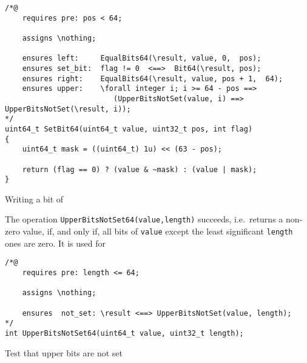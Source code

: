 \begin{listing}[hbt]
\begin{minipage}{0.99\textwidth}
\begin{lstlisting}[style=acsl-block]
/*@
    requires pre: pos < 64;

    assigns \nothing;

    ensures left:     EqualBits64(\result, value, 0,  pos);
    ensures set_bit:  flag != 0  <==>  Bit64(\result, pos);
    ensures right:    EqualBits64(\result, value, pos + 1,  64);
    ensures upper:    \forall integer i; i >= 64 - pos ==>
                         (UpperBitsNotSet(value, i) ==> UpperBitsNotSet(\result, i));
*/
uint64_t SetBit64(uint64_t value, uint32_t pos, int flag)
{
    uint64_t mask = ((uint64_t) 1u) << (63 - pos);

    return (flag == 0) ? (value & ~mask) : (value | mask);
}
\end{lstlisting}
\end{minipage}
\caption{\label{lst:SetBit64}Writing a bit of }
\end{listing}




The operation \lstinline{UpperBitsNotSet64(value,length)} succeeds, i.e.\ returns a
non-zero value, if, and only if, all bits of \lstinline{value} except the least significant
\lstinline{length} ones are zero.
%
It is used for 





\begin{listing}[hbt]
\begin{minipage}{0.99\textwidth}
\begin{lstlisting}[style=acsl-block]
/*@
    requires pre: length <= 64;

    assigns \nothing;

    ensures  not_set: \result <==> UpperBitsNotSet(value, length);
*/
int UpperBitsNotSet64(uint64_t value, uint32_t length);
\end{lstlisting}
\end{minipage}
\caption{\label{lst:UpperBitsNotSet64}Test that upper bits are not set}
\end{listing}
%










